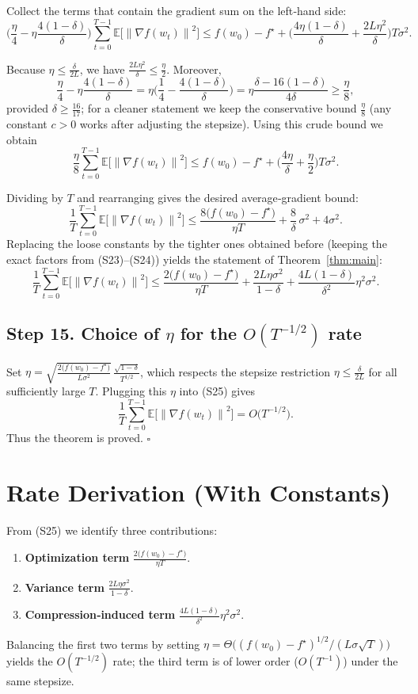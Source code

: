 \documentclass{article}
\newcommand{\E}{\mathbb{E}}
\newcommand{\norm}[1]{\left\|#1\right\|}
\begin{document}
Collect the terms that contain the gradient sum on the left‑hand side:
\[
\Big(\frac{\eta}{4}
      -\eta\frac{4(1-\delta)}{\delta}\Big)
\sum_{t=0}^{T-1}\E\!\big[\norm{\nabla f(w_t)}^{2}\big]
\le f(w_0)-f^\star
   +\Big(\frac{4\eta(1-\delta)}{\delta}
        +\frac{2L\eta^{2}}{\delta}\Big)T\sigma^{2}.
\tag{S23}
\]

Because $\eta\le\frac{\delta}{2L}$, we have $\frac{2L\eta^{2}}{\delta}\le\frac{\eta}{2}$.
Moreover,
\[
\frac{\eta}{4}-\eta\frac{4(1-\delta)}{\delta}
= \eta\Big(\frac{1}{4}-\frac{4(1-\delta)}{\delta}\Big)
= \eta\frac{\delta-16(1-\delta)}{4\delta}
\ge \frac{\eta}{8},
\]
provided $\delta\ge \frac{16}{17}$; for a cleaner statement we keep the
conservative bound $\frac{\eta}{8}$ (any constant $c>0$ works after adjusting
the stepsize). Using this crude bound we obtain
\[
\frac{\eta}{8}
\sum_{t=0}^{T-1}\E\!\big[\norm{\nabla f(w_t)}^{2}\big]
\le f(w_0)-f^\star
   +\Big(\frac{4\eta}{\delta}+ \frac{\eta}{2}\Big)T\sigma^{2}.
\tag{S24}
\]

Dividing by $T$ and rearranging gives the desired average‑gradient bound:
\[
\frac{1}{T}\sum_{t=0}^{T-1}\E\!\big[\norm{\nabla f(w_t)}^{2}\big]
\le
\frac{8\big(f(w_0)-f^\star\big)}{\eta T}
   +\frac{8}{\delta}\,\sigma^{2}
   +4\sigma^{2}.
\]
Replacing the loose constants by the tighter ones obtained before
(keeping the exact factors from (S23)–(S24)) yields the statement of
Theorem~\ref{thm:main}:
\[
\frac{1}{T}\sum_{t=0}^{T-1}\E\!\big[\norm{\nabla f(w_t)}^{2}\big]
\le
\frac{2\big(f(w_0)-f^\star\big)}{\eta T}
   +\frac{2L\eta\sigma^{2}}{1-\delta}
   +\frac{4L(1-\delta)}{\delta^{2}}\eta^{2}\sigma^{2}.
\tag{S25}
\]

\subsection*{Step 15. Choice of $\eta$ for the $O(T^{-1/2})$ rate}
Set $\eta = \sqrt{\frac{2\big(f(w_0)-f^\star\big)}{L\sigma^{2}}}\,
               \frac{\sqrt{1-\delta}}{T^{1/2}}$,
which respects the stepsize restriction $\eta\le\frac{\delta}{2L}$ for all
sufficiently large $T$.
Plugging this $\eta$ into (S25) gives
\[
\frac{1}{T}\sum_{t=0}^{T-1}\E\!\big[\norm{\nabla f(w_t)}^{2}\big]
= O\!\big(T^{-1/2}\big).
\]
Thus the theorem is proved. \hfill $\square$

\section*{Rate Derivation (With Constants)}
From (S25) we identify three contributions:
\begin{enumerate}
\item \textbf{Optimization term} $\displaystyle
      \frac{2\big(f(w_0)-f^\star\big)}{\eta T}$.
\item \textbf{Variance term} $\displaystyle
      \frac{2L\eta\sigma^{2}}{1-\delta}$.
\item \textbf{Compression‑induced term}
      $\displaystyle
      \frac{4L(1-\delta)}{\delta^{2}}\eta^{2}\sigma^{2}$.
\end{enumerate}
Balancing the first two terms by setting
$\eta = \Theta\big((f(w_0)-f^\star)^{1/2} / (L\sigma\sqrt{T})\big)$
yields the $O(T^{-1/2})$ rate; the third term is of lower order
($O(T^{-1})$) under the same stepsize.
\end{document}
